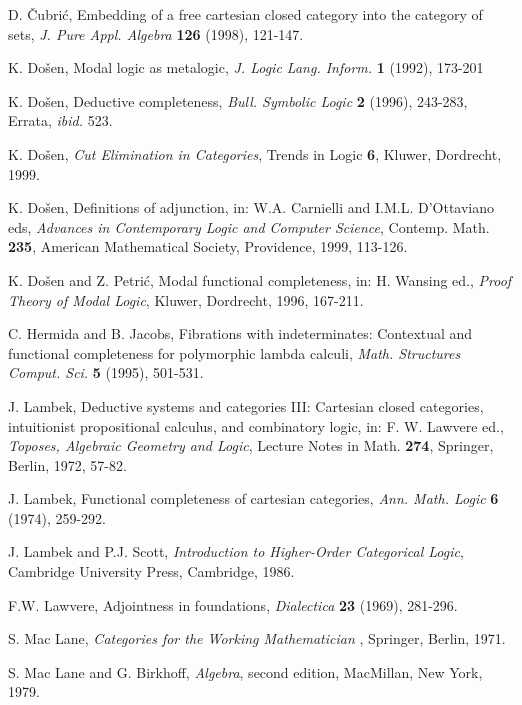 \begin{thebibliography}{99}
  D. \v {C}ubri\'{c}, Embedding of a free cartesian closed
category into the category of sets, {\it J. Pure Appl. Algebra} {\bf 126}
(1998), 121-147.

  K. Do\v {s}en, Modal logic as metalogic, {\it J. Logic Lang.
Inform.} {\bf 1 }(1992), 173-201

  K. Do\v {s}en, Deductive completeness, {\it Bull. Symbolic
Logic} {\bf 2 }(1996), 243-283, Errata, {\it ibid.} 523.

  K. Do\v {s}en, {\it Cut Elimination in Categories}, Trends
in Logic {\bf 6}, Kluwer, Dordrecht, 1999.

  K. Do\v {s}en, Definitions of adjunction, in: W.A.
Carnielli and I.M.L. D'Ottaviano eds, {\it Advances in Contemporary Logic
and Computer Science}, Contemp. Math. {\bf 235}, American Mathematical
Society, Providence, 1999, 113-126.

  K. Do\v {s}en and Z. Petri\'{c}, Modal functional
completeness, in: H. Wansing ed., {\it Proof Theory of Modal Logic}, Kluwer,
Dordrecht, 1996, 167-211.

  C. Hermida and B. Jacobs, Fibrations with indeterminates:
Contextual and functional completeness for polymorphic lambda calculi, {\it %
Math. Structures Comput. Sci.} {\bf 5} (1995), 501-531.

  J. Lambek, Deductive systems and categories III: Cartesian
closed categories, intuitionist propositional calculus, and combinatory
logic, in: F. W. Lawvere ed., {\it Toposes, Algebraic Geometry and Logic},
Lecture Notes in Math. {\bf 274}, Springer, Berlin, 1972, 57-82.

  J. Lambek, Functional completeness of cartesian categories, 
{\it Ann. Math. Logic} {\bf 6} (1974), 259-292.

  J. Lambek and P.J. Scott, {\it Introduction to Higher-Order
Categorical Logic}, Cambridge University Press, Cambridge, 1986.

  F.W. Lawvere, Adjointness in foundations, {\it Dialectica} 
{\bf 23} (1969), 281-296.

  S. Mac Lane, {\it Categories for the Working Mathematician}%
, Springer, Berlin, 1971.

  S. Mac Lane and G. Birkhoff, {\it Algebra}, second
edition, MacMillan, New York, 1979.
\end{thebibliography}


